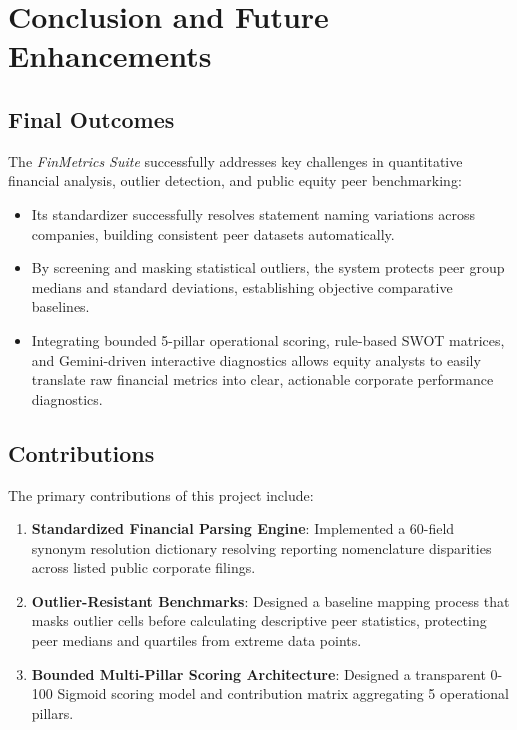 \chapter{Conclusion and Future Enhancements}
\label{ch:conclusion}

\section{Final Outcomes}
The \textit{FinMetrics Suite} successfully addresses key challenges in quantitative financial analysis, outlier detection, and public equity peer benchmarking:
\begin{itemize}
    \item Its standardizer successfully resolves statement naming variations across companies, building consistent peer datasets automatically.
    \item By screening and masking statistical outliers, the system protects peer group medians and standard deviations, establishing objective comparative baselines.
    \item Integrating bounded 5-pillar operational scoring, rule-based SWOT matrices, and Gemini-driven interactive diagnostics allows equity analysts to easily translate raw financial metrics into clear, actionable corporate performance diagnostics.
\end{itemize}

\section{Contributions}
The primary contributions of this project include:
\begin{enumerate}
    \item \textbf{Standardized Financial Parsing Engine}: Implemented a 60-field synonym resolution dictionary resolving reporting nomenclature disparities across listed public corporate filings.
    \item \textbf{Outlier-Resistant Benchmarks}: Designed a baseline mapping process that masks outlier cells before calculating descriptive peer statistics, protecting peer medians and quartiles from extreme data points.
    \item \textbf{Bounded Multi-Pillar Scoring Architecture}: Designed a transparent 0-100 Sigmoid scoring model and contribution matrix aggregating 5 operational pillars.
\end{enumerate}

